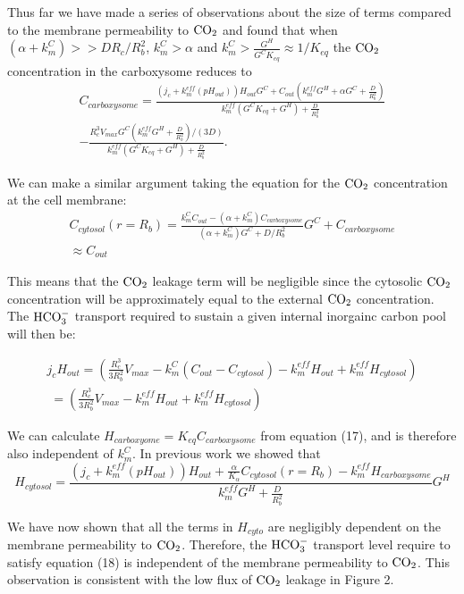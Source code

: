 \documentclass[]{article}
\begin{document}
Thus far we have made a series of observations about the size of terms compared to the membrane permeability to ${\rm CO_2}$ and found that when $(\alpha +k_m^C)>> D R_c/R_b^2$, $k_m^C > \alpha$ and $ k_m^C > \frac{G^H}{G^C K_{eq}} \approx 1/K_{eq}$ the ${\rm CO_2}$ concentration in the carboxysome reduces to 
\begin{multline}
C_{carboxysome} = \frac{(j_c+k_m^{eff}(pH_{out}))H_{out}G^C +  C_{out} (k_m^{eff} G^H +\alpha G^C+\frac{D}{R_b^2})}
	{k_m^{eff}(G^C K_{eq} +  G^H) + \frac{D}{R_b^2} }\\
-\frac{R_c^3 V_{max}G^C(k_m^{eff} G^H + \frac{D}{R_b^2})/(3D)}
	{k_m^{eff}(G^C K_{eq} +  G^H) + \frac{D}{R_b^2} }.
\end{multline}

We can make a similar argument taking the equation for the ${\rm CO_2}$ concentration at the cell membrane:
\begin{multline}
C_{cytosol}(r = R_b) = \frac{k_m^C C_{out} - (\alpha + k_m^C)C_{carboxysome}}{(\alpha+k_m^C)G^C + D/R_b^2}G^C + C_{carboxysome}\\
\approx C_{out}
\end{multline}

This means that the ${\rm CO_2}$ leakage term will be negligible since the cytosolic ${\rm CO_2}$ concentration will be approximately equal to the external ${\rm CO_2}$ concentration. The ${\rm HCO_3^-}$ transport required to sustain a given internal inorgainc carbon pool will then be:

\begin{multline}
j_c H_{out} =  \left(\frac{R_c^3}{3 R_b^2}  V_{max}  -k_m^C \left( C_{out} - C_{cytosol} \right) - k_m^{eff} H_{out} + k_m^{eff} H_{cytosol} \right) \\ 
\; = \left(\frac{R_c^3}{3 R_b^2}  V_{max}  - k_m^{eff} H_{out} + k_m^{eff} H_{cytosol} \right)
\end{multline}

We can calculate $H_{carboxyome} = K_{eq}C_{carboxysome}$ from equation (17), and is therefore also independent of $k_m^C$. In previous work we showed that 
\begin{equation}
H_{cytosol} =  \frac{(j_c + k_m^{eff}(pH_{out}))H_{out} + \frac{\alpha}{K_\alpha} C_{cytosol}(r=R_b) - k_m^{eff} H_{carboxysome} }{k_m^{eff} G^H + \frac{D}{R_b^2}}G^H
\end{equation}

We have now shown that all the terms in $H_{cyto}$ are negligibly dependent on the membrane permeability to ${\rm CO_2}$. Therefore, the ${\rm HCO_3^-}$ transport level require to satisfy equation (18) is independent of the membrane permeability to ${\rm CO_2}$. This observation is consistent with the low flux of ${\rm CO_2}$ leakage in Figure 2.
\end{document}
